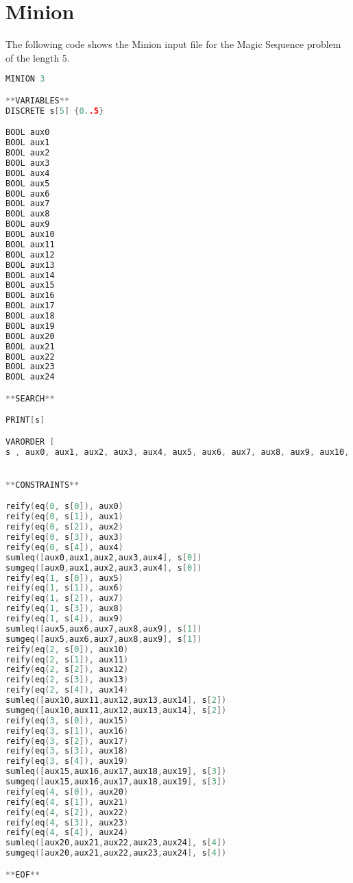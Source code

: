 \section{Minion}
\label{implementation:minion}

The following code shows the Minion input file for the Magic Sequence problem of the length 5. 

\begin{lstlisting}[language=C++]
MINION 3

**VARIABLES**
DISCRETE s[5] {0..5}

BOOL aux0
BOOL aux1
BOOL aux2
BOOL aux3
BOOL aux4
BOOL aux5
BOOL aux6
BOOL aux7
BOOL aux8
BOOL aux9
BOOL aux10
BOOL aux11
BOOL aux12
BOOL aux13
BOOL aux14
BOOL aux15
BOOL aux16
BOOL aux17
BOOL aux18
BOOL aux19
BOOL aux20
BOOL aux21
BOOL aux22
BOOL aux23
BOOL aux24

**SEARCH**

PRINT[s]

VARORDER [
s , aux0, aux1, aux2, aux3, aux4, aux5, aux6, aux7, aux8, aux9, aux10, aux11, aux12, aux13, aux14, aux15, aux16, aux17, aux18, aux19, aux20, aux21, aux22, aux23, aux24]


**CONSTRAINTS**

reify(eq(0, s[0]), aux0)
reify(eq(0, s[1]), aux1)
reify(eq(0, s[2]), aux2)
reify(eq(0, s[3]), aux3)
reify(eq(0, s[4]), aux4)
sumleq([aux0,aux1,aux2,aux3,aux4], s[0])
sumgeq([aux0,aux1,aux2,aux3,aux4], s[0])
reify(eq(1, s[0]), aux5)
reify(eq(1, s[1]), aux6)
reify(eq(1, s[2]), aux7)
reify(eq(1, s[3]), aux8)
reify(eq(1, s[4]), aux9)
sumleq([aux5,aux6,aux7,aux8,aux9], s[1])
sumgeq([aux5,aux6,aux7,aux8,aux9], s[1])
reify(eq(2, s[0]), aux10)
reify(eq(2, s[1]), aux11)
reify(eq(2, s[2]), aux12)
reify(eq(2, s[3]), aux13)
reify(eq(2, s[4]), aux14)
sumleq([aux10,aux11,aux12,aux13,aux14], s[2])
sumgeq([aux10,aux11,aux12,aux13,aux14], s[2])
reify(eq(3, s[0]), aux15)
reify(eq(3, s[1]), aux16)
reify(eq(3, s[2]), aux17)
reify(eq(3, s[3]), aux18)
reify(eq(3, s[4]), aux19)
sumleq([aux15,aux16,aux17,aux18,aux19], s[3])
sumgeq([aux15,aux16,aux17,aux18,aux19], s[3])
reify(eq(4, s[0]), aux20)
reify(eq(4, s[1]), aux21)
reify(eq(4, s[2]), aux22)
reify(eq(4, s[3]), aux23)
reify(eq(4, s[4]), aux24)
sumleq([aux20,aux21,aux22,aux23,aux24], s[4])
sumgeq([aux20,aux21,aux22,aux23,aux24], s[4])

**EOF**
\end{lstlisting}
